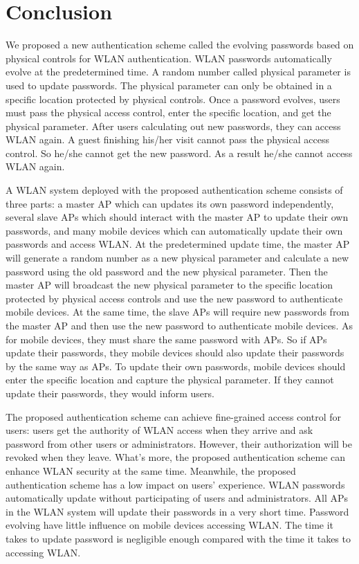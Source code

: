 \section{Conclusion}
We proposed a new authentication scheme called the evolving passwords based on physical controls for WLAN authentication. WLAN passwords automatically evolve at the predetermined time. A random number called physical parameter is used to update passwords. The physical parameter can only be obtained in a specific location protected by physical controls. Once a password evolves, users must pass the physical access control, enter the specific location, and get the physical parameter. After users calculating out new passwords, they can access WLAN again. A guest finishing his/her visit cannot pass the physical access control. So he/she cannot get the new password. As a result he/she cannot access WLAN again. 

A WLAN system deployed with the proposed authentication scheme consists of three parts: a master AP which can updates its own password independently, several slave APs which should interact with the master AP to update their own passwords, and many mobile devices which can automatically update their own passwords and access WLAN. At the predetermined update time, the master AP will generate a random number as a new physical parameter and calculate a new password using the old password and the new physical parameter. Then the master AP will broadcast the new physical parameter to the specific location protected by physical access controls and use the new password to authenticate mobile devices. At the same time, the slave APs will require new passwords from the master AP and then use the new password to authenticate mobile devices. As for mobile devices, they must share the same password with APs. So if APs update their passwords, they mobile devices should also update their passwords by the same way as APs. To update their own passwords, mobile devices should enter the specific location and capture the physical parameter. If they cannot update their passwords, they would inform users. 

The proposed authentication scheme can achieve fine-grained access control for users: users get the authority of WLAN access when they arrive and ask password from other users or administrators. However, their authorization will be revoked when they leave. What’s more, the proposed authentication scheme can enhance WLAN security at the same time. Meanwhile, the proposed authentication scheme has a low impact on users’ experience. WLAN passwords automatically update without participating of users and administrators. All APs in the WLAN system will update their passwords in a very short time. Password evolving have little influence on mobile devices accessing WLAN. The time it takes to update password is negligible enough compared with the time it takes to accessing WLAN. 
